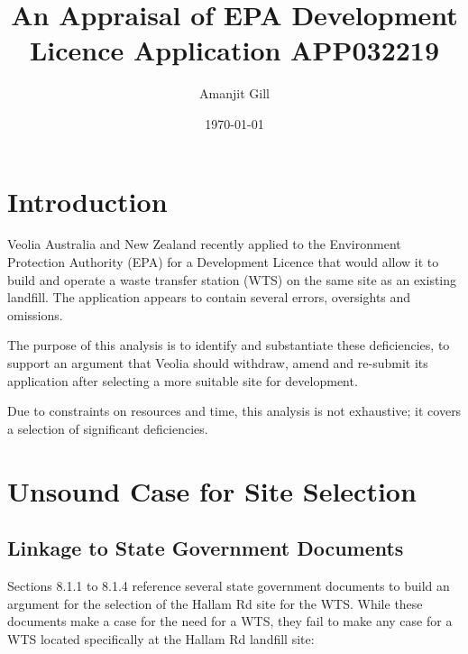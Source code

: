 \documentclass[12pt]{article}
\title{\textbf{An Appraisal of EPA Development Licence Application APP032219}}
\author{Amanjit Gill}
\date{\today}
\begin{document}
\maketitle

\section*{Introduction}

Veolia Australia and New Zealand recently applied to the Environment Protection Authority (EPA) for a Development Licence that would allow it to build and operate a waste transfer station (WTS) on the same site as an existing landfill. The application appears to contain several errors, oversights and omissions. 

The purpose of this analysis is to identify and substantiate these deficiencies, to support an argument that Veolia should withdraw, amend and re-submit its application after selecting a more suitable site for development.

Due to constraints on resources and time, this analysis is not exhaustive; it covers a selection of significant deficiencies. 

\section{Unsound Case for Site Selection}

\subsection{Linkage to State Government Documents}

Sections 8.1.1 to 8.1.4 reference several state government documents to build an argument for the selection of the Hallam Rd site for the WTS. While these documents make a case for the need for a WTS, they fail to make any case for a WTS located specifically at the Hallam Rd landfill site:
\end{document}

